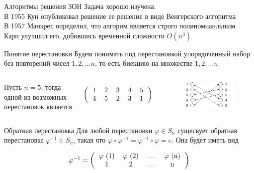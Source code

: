 \documentclass[12pt]{beamer}
\begin{document}
\begin{frame}{Алгоритмы решения ЗОН}
Задача хорошо изучена. \\
В 1955 Кун опубликовал решение ее решение в виде Венгерского алгоритма \\
В 1957 Манкрес определил, что алгорим является строго полиномианльным \\
Карп улучшил его, добившись временной сложности $O(n^3)$
\end{frame}

\begin{frame}{Понятие перестановки}
Будем понимать под перестановкой упорядоченный набор без повторений чисел $1, 2, \ldots n$, то есть
биекцию на множестве ${1, 2, \ldots n}$ \\
\begin{columns}
Пусть $n=5$, тогда одной из возможных перестановок является

\[
\left (
  \begin{tabular}{ccccc}
  1 & 2 & 3 & 4 & 5\\
  4 & 5 & 2 & 3 & 1
  \end{tabular}
\right )
\]

\begin{figure}
\includegraphics[scale=0.5]{premutation.png}
\end{figure}
\end{columns}
\end{frame}

\begin{frame}{Обратная перестановка}
Для любой перестановки $\varphi \in S_n$ сущесвует обратная перестановка $\varphi^{-1} \in S_n$, такая что 
$\varphi \circ \varphi^{-1} = \varphi^{-1} \circ \varphi  = e$. Она будет иметь вид 

\begin{equation} 
\varphi^{-1} = \left (
  \begin{tabular}{cccc}
  $\varphi$ (1) & $\varphi$ (2) & \ldots & $\varphi$ (n) \\
  1 		 & 2 		  & \ldots & n
  \end{tabular}
\right )
\end{equation}
\end{frame}
\end{document}
